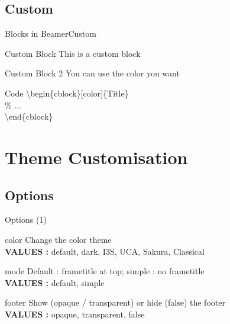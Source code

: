 \documentclass[aspectratio=43]{beamer}
\begin{document}
\subsection{Custom}

\begin{frame}{Blocks in Beamer}{Custom}

    \begin{cblock}[AlertBlockTitle]{Custom Block}
        This is a custom block
    \end{cblock}\newline

    \begin{cblock}[BlockTitle]{Custom Block 2}
        You can use the color you want
    \end{cblock}\newline

    \begin{cblock}[ExampleBlockTitle]{Code}
        \textbackslash begin\{cblock\}[color]\{Title\}\\
            \% ...\\
        \textbackslash end\{cblock\}
    \end{cblock}

\end{frame}


\section{Theme Customisation}
\subsection{Options}

\begin{frame}{Options (1)}

    \begin{cblock}[violet]{color}
        Change the color theme\\
        \textbf{VALUES :} default, dark, I3S, UCA, Sakura, Classical
    \end{cblock}\nline

    \begin{cblock}[blue]{mode}
        Default : frametitle at top;  simple : no frametitle\\
        \textbf{VALUES :} default, simple
    \end{cblock}\nline

    \begin{cblock}[green]{footer}
        Show (opaque / transparent) or hide (false) the footer\\
        \textbf{VALUES :} opaque, transparent, false
    \end{cblock}

\end{frame}
\end{document}
